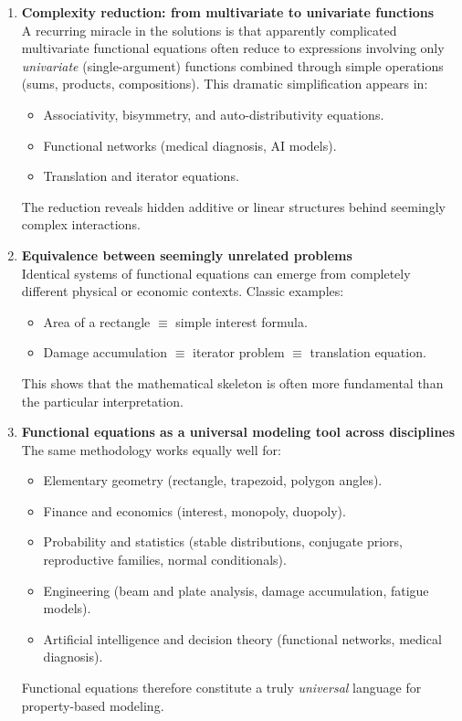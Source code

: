 \begin{enumerate}
\item \textbf{Complexity reduction: from multivariate to univariate functions}\\
A recurring miracle in the solutions is that apparently complicated multivariate functional equations often reduce to expressions involving only \emph{univariate} (single-argument) functions combined through simple operations (sums, products, compositions). This dramatic simplification appears in:
\begin{itemize}
\item Associativity, bisymmetry, and auto-distributivity equations.
\item Functional networks (medical diagnosis, AI models).
\item Translation and iterator equations.
\end{itemize}
The reduction reveals hidden additive or linear structures behind seemingly complex interactions.

\item \textbf{Equivalence between seemingly unrelated problems}\\
Identical systems of functional equations can emerge from completely different physical or economic contexts. Classic examples:
\begin{itemize}
\item Area of a rectangle $\equiv$ simple interest formula.
\item Damage accumulation $\equiv$ iterator problem $\equiv$ translation equation.
\end{itemize}
This shows that the mathematical skeleton is often more fundamental than the particular interpretation.

\item \textbf{Functional equations as a universal modeling tool across disciplines}\\
The same methodology works equally well for:
\begin{itemize}
\item Elementary geometry (rectangle, trapezoid, polygon angles).
\item Finance and economics (interest, monopoly, duopoly).
\item Probability and statistics (stable distributions, conjugate priors, reproductive families, normal conditionals).
\item Engineering (beam and plate analysis, damage accumulation, fatigue models).
\item Artificial intelligence and decision theory (functional networks, medical diagnosis).
\end{itemize}
Functional equations therefore constitute a truly \emph{universal} language for property-based modeling.
\end{enumerate}


